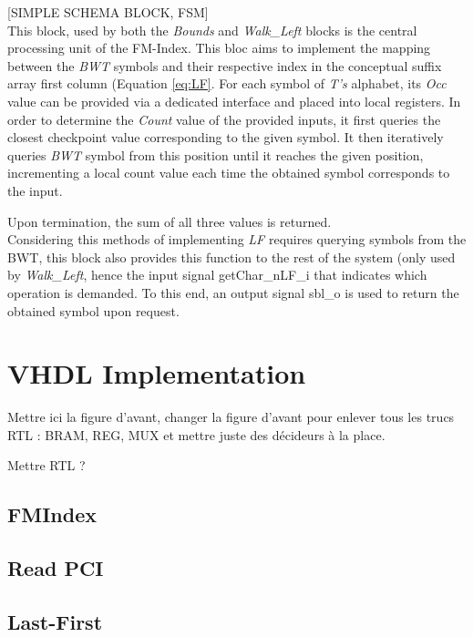 [SIMPLE SCHEMA BLOCK, FSM] \\

This block, used by both the \textsl{Bounds} and \textsl{Walk\_Left} blocks is the central processing unit of the FM-Index. This bloc aims to implement the mapping between the \textsl{BWT} symbols and their respective index in the conceptual suffix array first column (Equation \ref{eq:LF}. For each symbol of \textsl{T's} alphabet, its \textsl{Occ} value can be provided via a dedicated interface and placed into local registers. In order to determine the \textsl{Count} value of the provided inputs, it first queries the closest checkpoint value corresponding to the given symbol. It then iteratively queries \textsl{BWT} symbol from this position until it reaches the given position, incrementing a local count value each time the obtained symbol corresponds to the input.

Upon termination, the sum of all three values is returned. \\

Considering this methods of implementing \textsl{LF} requires querying symbols from the BWT, this block also provides this function to the rest of the system (only used by \textsl{Walk\_Left}, hence the input signal \textrm{getChar\_nLF\_i} that indicates which operation is demanded. To this end, an output signal \textrm{sbl\_o} is used to return the obtained symbol upon request.

\section{VHDL Implementation}

Mettre ici la figure d'avant, changer la figure d'avant pour enlever tous les trucs RTL : BRAM, REG, MUX et mettre juste des décideurs à la place.

Mettre RTL ?

\subsection{FMIndex}

\subsection{Read PCI}

\subsection{Last-First}

